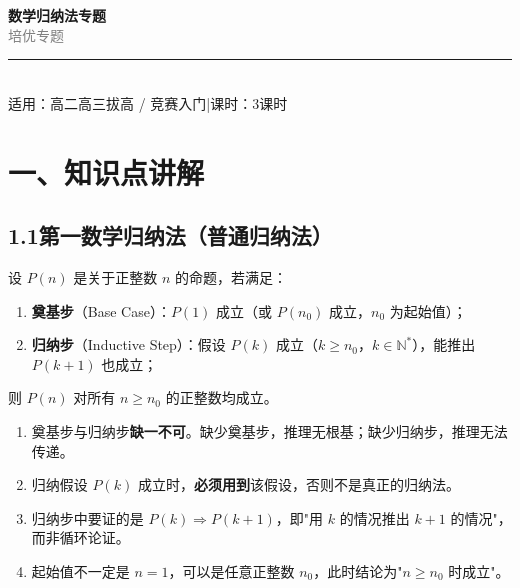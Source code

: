 \documentclass[12pt, a4paper]{ctexart}
\begin{document}
\begin{center}
{\Huge\bfseries\textcolor{mainblue}{数学归纳法专题}}\\[12pt]
{\Large\textcolor{gray}{培\quad 优\quad 专\quad 题}}\\[8pt]
\rule{0.6\textwidth}{1pt}\\[8pt]
{\normalsize 适用：高二高三拔高 / 竞赛入门\quad |\quad 课时：3课时}
\end{center}
\vspace{10pt}

\section*{\textcolor{mainblue}{一、知识点讲解}}

\subsection*{1.1\quad 第一数学归纳法（普通归纳法）}

\begin{knowledgebox}[第一数学归纳法原理]
设 $P(n)$ 是关于正整数 $n$ 的命题，若满足：
\begin{enumerate}[label=(\arabic*)]
  \item \textbf{奠基步}（Base Case）：$P(1)$ 成立（或 $P(n_0)$ 成立，$n_0$ 为起始值）；
  \item \textbf{归纳步}（Inductive Step）：假设 $P(k)$ 成立（$k \geq n_0$，$k \in \mathbb{N}^*$），能推出 $P(k+1)$ 也成立；
\end{enumerate}
则 $P(n)$ 对所有 $n \geq n_0$ 的正整数均成立。
\end{knowledgebox}

\begin{warnbox}[归纳法使用要点]
\begin{enumerate}[label=(\arabic*)]
  \item 奠基步与归纳步\textbf{缺一不可}。缺少奠基步，推理无根基；缺少归纳步，推理无法传递。
  \item 归纳假设 $P(k)$ 成立时，\textbf{必须用到}该假设，否则不是真正的归纳法。
  \item 归纳步中要证的是 $P(k) \Rightarrow P(k+1)$，即"用 $k$ 的情况推出 $k+1$ 的情况"，而非循环论证。
  \item 起始值不一定是 $n=1$，可以是任意正整数 $n_0$，此时结论为"$n \geq n_0$ 时成立"。
\end{enumerate}
\end{warnbox}
\end{document}
